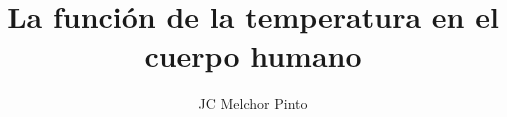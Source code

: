 \documentclass[12pt,addpoints,answers]{guia}
\title{La función de la temperatura en el cuerpo humano}
\author{JC Melchor Pinto}
\begin{document}
\INFO%
\begin{questions}
    \questionboxed[25]{}
    \questionboxed[25]{}
    \questionboxed[25]{}
\end{questions}
\end{document}
